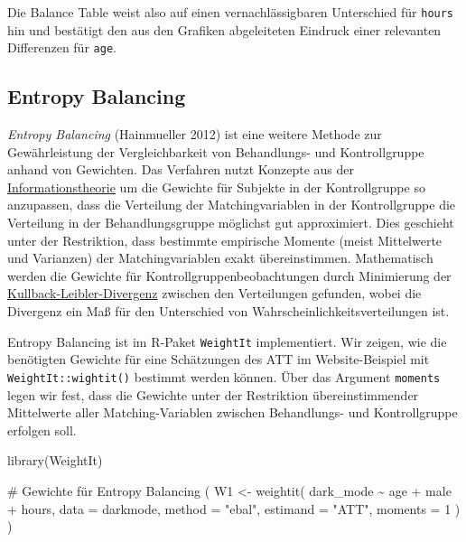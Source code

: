 \documentclass[
  a4paper,
  DIV=11,
  oneside]{scrreprt}
\newenvironment{Shaded}{\begin{snugshade}}{\end{snugshade}}
\newcommand{\AttributeTok}[1]{\textcolor[rgb]{0.40,0.45,0.13}{#1}}
\newcommand{\CommentTok}[1]{\textcolor[rgb]{0.37,0.37,0.37}{#1}}
\newcommand{\DecValTok}[1]{\textcolor[rgb]{0.68,0.00,0.00}{#1}}
\newcommand{\FunctionTok}[1]{\textcolor[rgb]{0.28,0.35,0.67}{#1}}
\newcommand{\NormalTok}[1]{\textcolor[rgb]{0.00,0.23,0.31}{#1}}
\newcommand{\OtherTok}[1]{\textcolor[rgb]{0.00,0.23,0.31}{#1}}
\newcommand{\SpecialCharTok}[1]{\textcolor[rgb]{0.37,0.37,0.37}{#1}}
\newcommand{\StringTok}[1]{\textcolor[rgb]{0.13,0.47,0.30}{#1}}
\begin{document}
Die Balance Table weist also auf einen vernachlässigbaren Unterschied
für \texttt{hours} hin und bestätigt den aus den Grafiken abgeleiteten
Eindruck einer relevanten Differenzen für \texttt{age}.

\hypertarget{entropy-balancing}{%
\subsection{Entropy Balancing}\label{entropy-balancing}}

\emph{Entropy Balancing} (Hainmueller 2012) ist eine weitere Methode zur
Gewährleistung der Vergleichbarkeit von Behandlungs- und Kontrollgruppe
anhand von Gewichten. Das Verfahren nutzt Konzepte aus der
\href{https://de.wikipedia.org/wiki/Informationstheorie}{Informationstheorie}
um die Gewichte für Subjekte in der Kontrollgruppe so anzupassen, dass
die Verteilung der Matchingvariablen in der Kontrollgruppe die
Verteilung in der Behandlungsgruppe möglichst gut approximiert. Dies
geschieht unter der Restriktion, dass bestimmte empirische Momente
(meist Mittelwerte und Varianzen) der Matchingvariablen exakt
übereinstimmen. Mathematisch werden die Gewichte für
Kontrollgruppenbeobachtungen durch Minimierung der
\href{https://de.wikipedia.org/wiki/Kullback-Leibler-Divergenz}{Kullback-Leibler-Divergenz}
zwischen den Verteilungen gefunden, wobei die Divergenz ein Maß für den
Unterschied von Wahrscheinlichkeitsverteilungen ist.

Entropy Balancing ist im R-Paket \texttt{WeightIt} implementiert. Wir
zeigen, wie die benötigten Gewichte für eine Schätzungen des ATT im
Website-Beispiel mit \texttt{WeightIt::wightit()} bestimmt werden
können. Über das Argument \texttt{moments} legen wir fest, dass die
Gewichte unter der Restriktion übereinstimmender Mittelwerte aller
Matching-Variablen zwischen Behandlungs- und Kontrollgruppe erfolgen
soll.

\begin{Shaded}
\begin{Highlighting}[]
\FunctionTok{library}\NormalTok{(WeightIt)}

\CommentTok{\# Gewichte für Entropy Balancing}
\NormalTok{(}
\NormalTok{  W1 }\OtherTok{\textless{}{-}} \FunctionTok{weightit}\NormalTok{(}
\NormalTok{  dark\_mode }\SpecialCharTok{\textasciitilde{}}\NormalTok{ age }\SpecialCharTok{+}\NormalTok{ male }\SpecialCharTok{+}\NormalTok{ hours,}
  \AttributeTok{data =}\NormalTok{ darkmode,}
  \AttributeTok{method =} \StringTok{"ebal"}\NormalTok{, }
  \AttributeTok{estimand =} \StringTok{"ATT"}\NormalTok{,}
  \AttributeTok{moments =} \DecValTok{1}
\NormalTok{  )}
\NormalTok{ )}
\end{Highlighting}
\end{Shaded}
\end{document}
